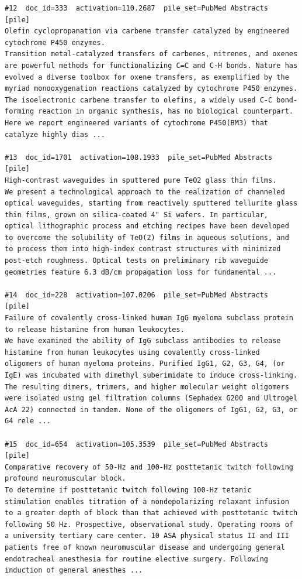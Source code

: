 \begin{verbatim}
#12  doc_id=333  activation=110.2687  pile_set=PubMed Abstracts  [pile]
Olefin cyclopropanation via carbene transfer catalyzed by engineered cytochrome P450 enzymes.
Transition metal-catalyzed transfers of carbenes, nitrenes, and oxenes are powerful methods for functionalizing C=C and C-H bonds. Nature has evolved a diverse toolbox for oxene transfers, as exemplified by the myriad monooxygenation reactions catalyzed by cytochrome P450 enzymes. The isoelectronic carbene transfer to olefins, a widely used C-C bond-forming reaction in organic synthesis, has no biological counterpart. Here we report engineered variants of cytochrome P450(BM3) that catalyze highly dias ...

#13  doc_id=1701  activation=108.1933  pile_set=PubMed Abstracts  [pile]
High-contrast waveguides in sputtered pure TeO2 glass thin films.
We present a technological approach to the realization of channeled optical waveguides, starting from reactively sputtered tellurite glass thin films, grown on silica-coated 4" Si wafers. In particular, optical lithographic process and etching recipes have been developed to overcome the solubility of TeO(2) films in aqueous solutions, and to process them into high-index contrast structures with minimized post-etch roughness. Optical tests on preliminary rib waveguide geometries feature 6.3 dB/cm propagation loss for fundamental ...

#14  doc_id=228  activation=107.0206  pile_set=PubMed Abstracts  [pile]
Failure of covalently cross-linked human IgG myeloma subclass protein to release histamine from human leukocytes.
We have examined the ability of IgG subclass antibodies to release histamine from human leukocytes using covalently cross-linked oligomers of human myeloma proteins. Purified IgG1, G2, G3, G4, (or IgE) was incubated with dimethyl suberimidate to induce cross-linking. The resulting dimers, trimers, and higher molecular weight oligomers were isolated using gel filtration columns (Sephadex G200 and Ultrogel AcA 22) connected in tandem. None of the oligomers of IgG1, G2, G3, or G4 rele ...

#15  doc_id=654  activation=105.3539  pile_set=PubMed Abstracts  [pile]
Comparative recovery of 50-Hz and 100-Hz posttetanic twitch following profound neuromuscular block.
To determine if posttetanic twitch following 100-Hz tetanic stimulation enables titration of a nondepolarizing relaxant infusion to a greater depth of block than that achieved with posttetanic twitch following 50 Hz. Prospective, observational study. Operating rooms of a university tertiary care center. 10 ASA physical status II and III patients free of known neuromuscular disease and undergoing general endotracheal anesthesia for routine elective surgery. Following induction of general anesthes ...


\end{verbatim}
